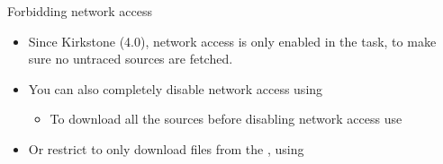 \begin{frame}{Forbidding network access}
  \begin{itemize}
    \item Since Kirkstone (4.0), network access is only enabled
          in the  task, to make sure no untraced sources
	  are fetched.
    \item You can also completely disable network access using
      \begin{itemize}
      \item To download all the sources before disabling network access use
      \end{itemize}
    \item Or restrict  to only download files from the
      , using 
  \end{itemize}
\end{frame}

